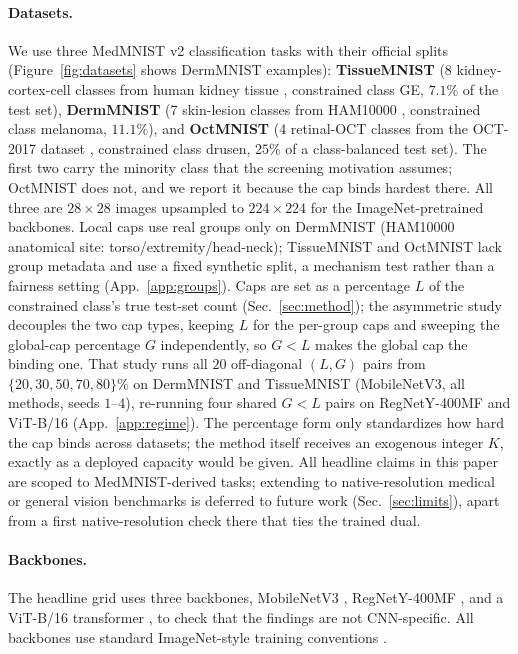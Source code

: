 \documentclass[10pt]{article}
\newcommand{\rev}[1]{{\color{blue}#1}}
\begin{document}
\paragraph{Datasets.}
We use three MedMNIST v2 \citep{yang2023medmnist} classification tasks with
their official splits (Figure~\ref{fig:datasets} shows DermMNIST examples):
\textbf{TissueMNIST} (8 \rev{kidney-cortex-cell} classes \rev{from human kidney
tissue \citep{woloshuk2021situ}}, constrained class GE, $7.1\%$ of the
test set), \textbf{DermMNIST} (7 skin-lesion classes from
HAM10000 \citep{tschandl2018ham10000}, constrained class melanoma,
$11.1\%$), and \textbf{OctMNIST} (4 retinal-OCT classes \rev{from the
OCT-2017 dataset \citep{kermany2018identifying}}, constrained class
drusen, $25\%$ of a class-balanced test set). The first two carry the minority class that
the screening motivation assumes; OctMNIST does not, and we report it
because the cap binds hardest there. All three are $28{\times}28$ images
upsampled to $224{\times}224$ for the ImageNet-pretrained backbones. Local
caps use real groups only on DermMNIST (HAM10000 anatomical site:
torso/extremity/head-neck); TissueMNIST and OctMNIST lack group metadata and
use a fixed synthetic split, a mechanism test rather than a fairness
setting (App.~\ref{app:groups}). Caps are set as a percentage $L$ of the
constrained class's true test-set count (Sec.~\ref{sec:method}); the
asymmetric study decouples the two cap types, keeping $L$ for the per-group
caps and sweeping the global-cap percentage $G$ independently, so $G{<}L$
makes the global cap the binding one. That study runs all $20$ off-diagonal
$(L,G)$ pairs from $\{20,30,50,70,80\}\%$ on DermMNIST and TissueMNIST
(MobileNetV3, all methods, seeds $1$--$4$), re-running four shared $G{<}L$
pairs on RegNetY-400MF and ViT-B/16 (App.~\ref{app:regime}). The
percentage form only standardizes how hard the cap binds across datasets;
the method itself receives an exogenous integer $K$, exactly as a deployed
capacity would be given. All headline claims in this paper are scoped to
MedMNIST-derived tasks; extending to native-resolution medical or general
vision benchmarks is deferred to future work (Sec.~\ref{sec:limits})\rev{,
apart from a first native-resolution check there that ties the trained dual}.

\paragraph{Backbones.}
The headline grid uses three backbones, MobileNetV3
\citep{howard2019searching}, RegNetY-400MF \citep{radosavovic2020designing},
and a ViT-B/16 transformer \citep{dosovitskiy2020image}, to check that the
findings are not CNN-specific. All backbones use standard ImageNet-style
training conventions \citep{he2016deep}.
\end{document}
